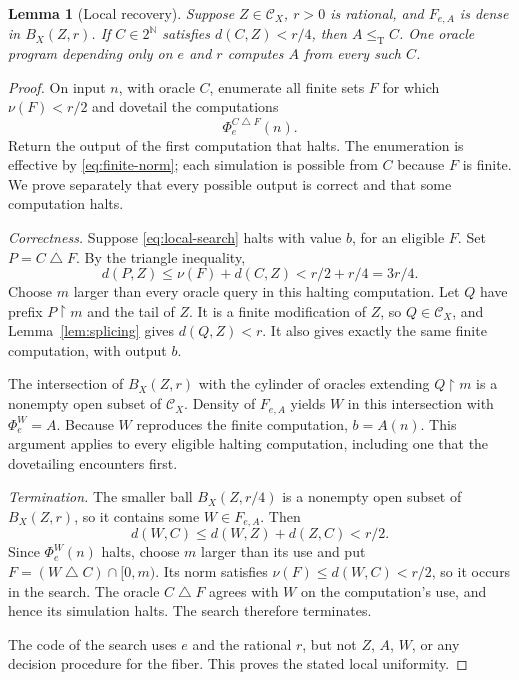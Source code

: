 \documentclass[11pt,a4paper]{article}
\newcommand{\N}{\mathbb N}
\newcommand{\Cantor}{2^{\N}}
\newcommand{\leT}{\leq_{\mathrm T}}
\newcommand{\CD}[1]{\mathcal C_{#1}}
\newcommand{\sdelta}{\mathbin{\triangle}}
\newcommand{\restrict}{\mathbin{\upharpoonright}}
\newtheorem{lemma}[theorem]{Lemma}
\theoremstyle{definition}\newtheorem{definition}[theorem]{Definition}
\theoremstyle{remark}\newtheorem{remark}[theorem]{Remark}
\begin{document}
\begin{lemma}[Local recovery]\label{lem:local}
Suppose $Z\in\CD X$, $r>0$ is rational, and $F_{e,A}$ is dense in $B_X(Z,r)$. If $C\in\Cantor$ satisfies $d(C,Z)<r/4$, then $A\leT C$. One oracle program depending only on $e$ and $r$ computes $A$ from every such $C$.
\end{lemma}
\begin{proof}
On input $n$, with oracle $C$, enumerate all finite sets $F$ for which $\nu(F)<r/2$ and dovetail the computations
\begin{equation}\label{eq:local-search}
                    \Phi_e^{C\sdelta F}(n).
\end{equation}
Return the output of the first computation that halts. The enumeration is effective by \eqref{eq:finite-norm}; each simulation is possible from $C$ because $F$ is finite. We prove separately that every possible output is correct and that some computation halts.

\emph{Correctness.} Suppose \eqref{eq:local-search} halts with value $b$, for an eligible $F$. Set $P=C\sdelta F$. By the triangle inequality,
\[
 d(P,Z)\le\nu(F)+d(C,Z)<r/2+r/4=3r/4.
\]
Choose $m$ larger than every oracle query in this halting computation. Let $Q$ have prefix $P\restrict m$ and the tail of $Z$. It is a finite modification of $Z$, so $Q\in\CD X$, and Lemma~\ref{lem:splicing} gives $d(Q,Z)<r$. It also gives exactly the same finite computation, with output $b$.

The intersection of $B_X(Z,r)$ with the cylinder of oracles extending $Q\restrict m$ is a nonempty open subset of $\CD X$. Density of $F_{e,A}$ yields $W$ in this intersection with $\Phi_e^W=A$. Because $W$ reproduces the finite computation, $b=A(n)$. This argument applies to every eligible halting computation, including one that the dovetailing encounters first.

\emph{Termination.} The smaller ball $B_X(Z,r/4)$ is a nonempty open subset of $B_X(Z,r)$, so it contains some $W\in F_{e,A}$. Then
\[
 d(W,C)\le d(W,Z)+d(Z,C)<r/2.
\]
Since $\Phi_e^W(n)$ halts, choose $m$ larger than its use and put
$F=(W\sdelta C)\cap[0,m)$. Its norm satisfies $\nu(F)\le d(W,C)<r/2$, so it occurs in the search. The oracle $C\sdelta F$ agrees with $W$ on the computation's use, and hence its simulation halts. The search therefore terminates.

The code of the search uses $e$ and the rational $r$, but not $Z$, $A$, $W$, or any decision procedure for the fiber. This proves the stated local uniformity.
\end{proof}
\end{document}
